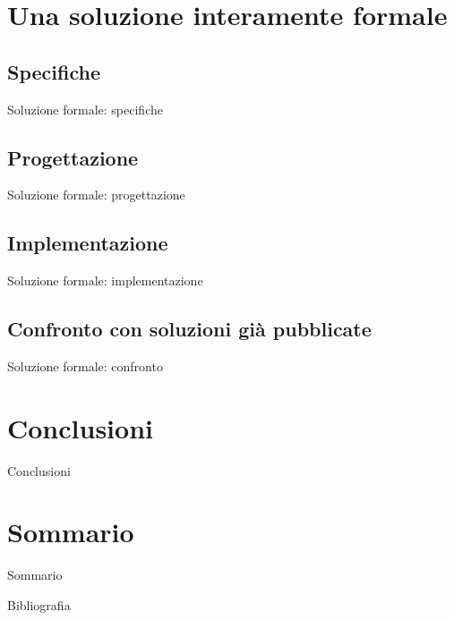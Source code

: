 \documentclass{beamer}
\begin{document}
\section{Una soluzione interamente formale}

\subsection{Specifiche}
\begin{frame}{Soluzione formale: specifiche}

\end{frame}

\subsection{Progettazione}
\begin{frame}{Soluzione formale: progettazione}

\end{frame}

\subsection{Implementazione}
\begin{frame}{Soluzione formale: implementazione}

\end{frame}

\subsection{Confronto con soluzioni già pubblicate}
\begin{frame}{Soluzione formale: confronto}

\end{frame}

\section{Conclusioni}
\begin{frame}{Conclusioni}

\end{frame}

\section{Sommario}
\begin{frame}{Sommario}

\end{frame}

\begin{frame}{Bibliografia}
	\printbibliography
\end{frame}
\end{document}
